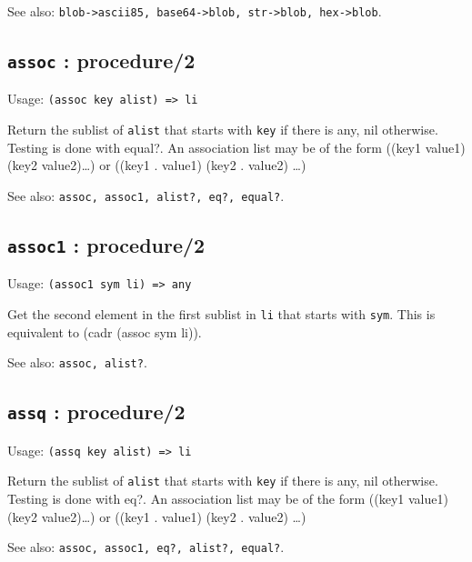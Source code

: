 \documentclass[
]{article}
\newcommand{\passthrough}[1]{#1}
\begin{document}
See also:
\passthrough{\lstinline!blob->ascii85, base64->blob, str->blob, hex->blob!}.

\hypertarget{assoc-procedure2-1}{%
\subsection{\texorpdfstring{\texttt{assoc} :
procedure/2}{assoc : procedure/2}}\label{assoc-procedure2-1}}

Usage: \passthrough{\lstinline!(assoc key alist) => li!}

Return the sublist of \passthrough{\lstinline!alist!} that starts with
\passthrough{\lstinline!key!} if there is any, nil otherwise. Testing is
done with equal?. An association list may be of the form ((key1
value1)(key2 value2)\ldots) or ((key1 . value1) (key2 . value2) \ldots)

See also: \passthrough{\lstinline!assoc, assoc1, alist?, eq?, equal?!}.

\hypertarget{assoc1-procedure2-1}{%
\subsection{\texorpdfstring{\texttt{assoc1} :
procedure/2}{assoc1 : procedure/2}}\label{assoc1-procedure2-1}}

Usage: \passthrough{\lstinline!(assoc1 sym li) => any!}

Get the second element in the first sublist in
\passthrough{\lstinline!li!} that starts with
\passthrough{\lstinline!sym!}. This is equivalent to (cadr (assoc sym
li)).

See also: \passthrough{\lstinline!assoc, alist?!}.

\hypertarget{assq-procedure2-1}{%
\subsection{\texorpdfstring{\texttt{assq} :
procedure/2}{assq : procedure/2}}\label{assq-procedure2-1}}

Usage: \passthrough{\lstinline!(assq key alist) => li!}

Return the sublist of \passthrough{\lstinline!alist!} that starts with
\passthrough{\lstinline!key!} if there is any, nil otherwise. Testing is
done with eq?. An association list may be of the form ((key1
value1)(key2 value2)\ldots) or ((key1 . value1) (key2 . value2) \ldots)

See also: \passthrough{\lstinline!assoc, assoc1, eq?, alist?, equal?!}.
\end{document}
